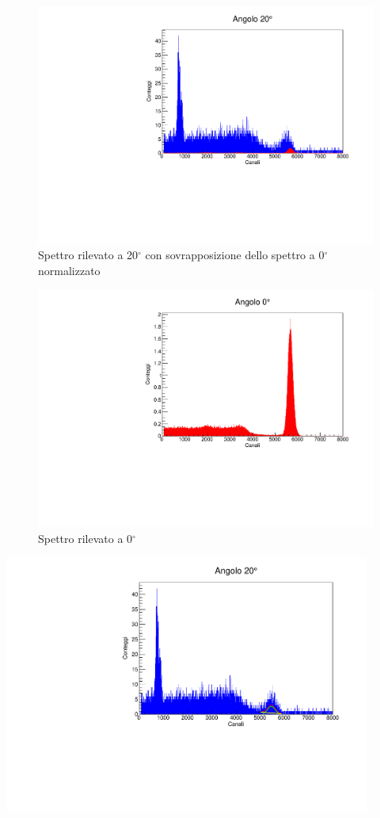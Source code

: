 \documentclass[italian,11pt]{report}
\begin{document}
\begin{figure}[htp]
\centering
\includegraphics[width=12cm]{20originale.pdf}
\caption{Spettro rilevato a 20$^\circ$ con sovrapposizione dello spettro a 0$^\circ$ normalizzato}
\end{figure}
\begin{figure}[htp]
\centering
\includegraphics[width=12cm]{0originale.pdf}
\caption{Spettro rilevato a 0$^\circ$}
\end{figure}
\begin{center}
\includegraphics[width=12cm]{20finale.pdf}
\end{center}
\end{document}

